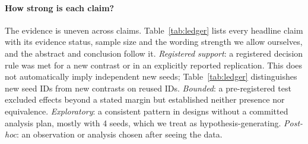 \documentclass[10pt]{article} %
\begin{document}
\paragraph{How strong is each claim?} The evidence is uneven across claims. Table~\ref{tab:ledger} lists every headline claim with its evidence status, sample size and the wording strength we allow ourselves, and the abstract and conclusion follow it. \emph{Registered support}: a registered decision rule was met for a new contrast or in an explicitly reported replication. This does not automatically imply independent new seeds; Table~\ref{tab:ledger} distinguishes new seed IDs from new contrasts on reused IDs. \emph{Bounded}: a pre-registered test excluded effects beyond a stated margin but established neither presence nor equivalence. \emph{Exploratory}: a consistent pattern in designs without a committed analysis plan, mostly with 4 seeds, which we treat as hypothesis-generating. \emph{Post-hoc}: an observation or analysis chosen after seeing the data.
\end{document}
